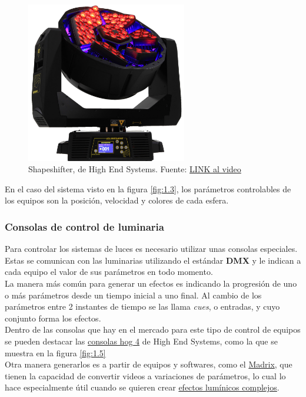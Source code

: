 \begin{figure}[!ht]
	\centering
	\includegraphics[width=7cm,scale=1]{resources/1_4-shapeshifter.jpg}
	\caption{Shapeshifter, de High End Systems. Fuente: \href{https://www.youtube.com/watch?v=LIIE3zZscYY}{LINK al video} }
	\label{fig:\thefigure}
\end{figure}

En el caso del sistema visto en la figura \ref{fig:1.3}, los parámetros controlables de los equipos son la posición, velocidad y colores de cada esfera.

\subsubsection{Consolas de control de luminaria}
Para controlar los sistemas de luces es necesario utilizar unas consolas especiales. Estas se comunican con las luminarias utilizando el estándar \textbf{DMX} y le indican a cada equipo el valor de sus parámetros en todo momento. \\

La manera más común para generar un efectos es indicando la progresión de uno o más parámetros desde un tiempo inicial a uno final. Al cambio de los parámetros entre 2 instantes de tiempo se las llama \textit{cues}, o entradas, y cuyo conjunto forma los efectos. \\
Dentro de las consolas que hay en el mercado para este tipo de control de equipos se pueden destacar las \href{https://www.highend.com/products/consoles}{consolas hog 4} de High End Systems, como la que se muestra en la figura \ref{fig:1.5}\\

Otra manera generarlos es a partir de equipos y softwares, como el \href{https://www.madrix.com/}{Madrix}, que tienen la capacidad de convertir videos a variaciones de parámetros, lo cual lo hace especialmente útil cuando se quieren crear \href{https://www.youtube.com/watch?v=mdbl5ks7Nu0}{efectos lumínicos complejos}.


